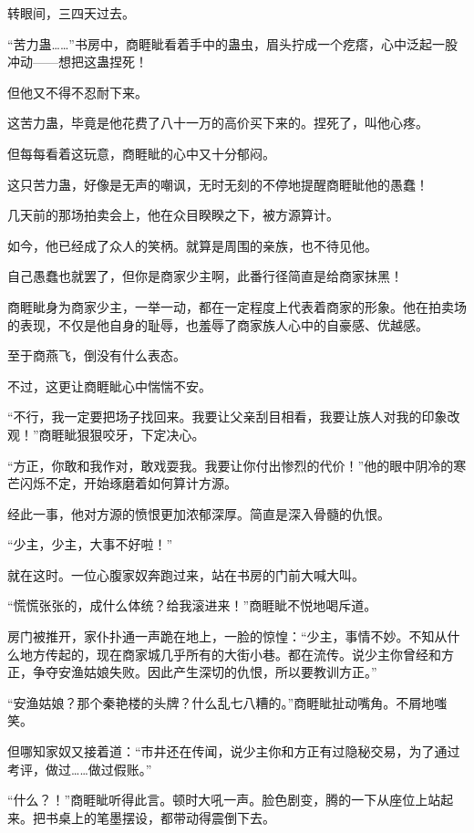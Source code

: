 
\begin{this_body}

转眼间，三四天过去。

“苦力蛊……”书房中，商睚眦看着手中的蛊虫，眉头拧成一个疙瘩，心中泛起一股冲动——想把这蛊捏死！

但他又不得不忍耐下来。

这苦力蛊，毕竟是他花费了八十一万的高价买下来的。捏死了，叫他心疼。

但每每看着这玩意，商睚眦的心中又十分郁闷。

这只苦力蛊，好像是无声的嘲讽，无时无刻的不停地提醒商睚眦他的愚蠢！

几天前的那场拍卖会上，他在众目睽睽之下，被方源算计。

如今，他已经成了众人的笑柄。就算是周围的亲族，也不待见他。

自己愚蠢也就罢了，但你是商家少主啊，此番行径简直是给商家抹黑！

商睚眦身为商家少主，一举一动，都在一定程度上代表着商家的形象。他在拍卖场的表现，不仅是他自身的耻辱，也羞辱了商家族人心中的自豪感、优越感。

至于商燕飞，倒没有什么表态。

不过，这更让商睚眦心中惴惴不安。

“不行，我一定要把场子找回来。我要让父亲刮目相看，我要让族人对我的印象改观！”商睚眦狠狠咬牙，下定决心。

“方正，你敢和我作对，敢戏耍我。我要让你付出惨烈的代价！”他的眼中阴冷的寒芒闪烁不定，开始琢磨着如何算计方源。

经此一事，他对方源的愤恨更加浓郁深厚。简直是深入骨髓的仇恨。

“少主，少主，大事不好啦！”

就在这时。一位心腹家奴奔跑过来，站在书房的门前大喊大叫。

“慌慌张张的，成什么体统？给我滚进来！”商睚眦不悦地喝斥道。

房门被推开，家仆扑通一声跪在地上，一脸的惊惶：“少主，事情不妙。不知从什么地方传起的，现在商家城几乎所有的大街小巷。都在流传。说少主你曾经和方正，争夺安渔姑娘失败。因此产生深切的仇恨，所以要教训方正。”

“安渔姑娘？那个秦艳楼的头牌？什么乱七八糟的。”商睚眦扯动嘴角。不屑地嗤笑。

但哪知家奴又接着道：“市井还在传闻，说少主你和方正有过隐秘交易，为了通过考评，做过……做过假账。”

“什么？！”商睚眦听得此言。顿时大吼一声。脸色剧变，腾的一下从座位上站起来。把书桌上的笔墨摆设，都带动得震倒下去。


\end{this_body}
